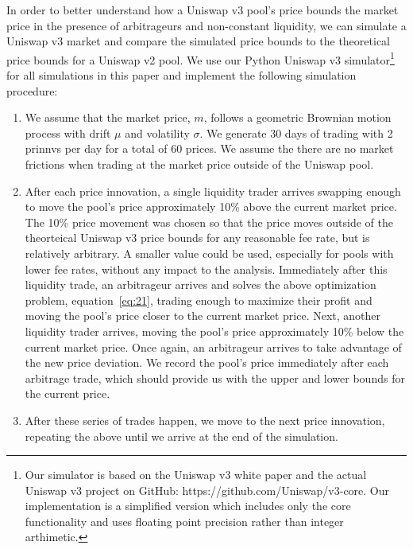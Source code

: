 \documentclass[11pt]{article}
\begin{document}
In order to better understand how a Uniswap v3 pool's price bounds the market price in the presence of arbitrageurs and non-constant liquidity, we can simulate a Uniswap v3 market and compare the simulated price bounds to the theoretical price bounds for a Uniswap v2 pool. We use our Python Uniswap v3 simulator\footnote{Our simulator is based on the Uniswap v3 white paper and the actual Uniswap v3 project on GitHub: https://github.com/Uniswap/v3-core. Our implementation is a simplified version which includes only the core functionality and uses floating point precision rather than integer arthimetic.} for all simulations in this paper and implement the following simulation procedure:
\begin{enumerate}
    \item We assume that the market price, $m$, follows a geometric Brownian motion process with drift $\mu$ and volatility $\sigma$. We generate 30 days of trading with 2 \glspl{prinnv} per day for a total of 60 prices. We assume the there are no market frictions when trading at the market price outside of the Uniswap pool.

    \item After each price innovation, a single liquidity trader arrives swapping enough to move the pool's price approximately 10\% above the current market price. The 10\% price movement was chosen so that the price moves outside of the theorteical Uniswap v3 price bounds for any reasonable fee rate, but is relatively arbitrary. A smaller value could be used, especially for pools with lower fee rates, without any impact to the analysis. Immediately after this liquidity trade, an arbitrageur arrives and solves the above optimization problem, equation~\eqref{eq:21}, trading enough to maximize their profit and moving the pool's price closer to the current market price. Next, another liquidity trader arrives, moving the pool's price approximately 10\% below the current market price. Once again, an arbitrageur arrives to take advantage of the new price deviation. We record the pool's price immediately after each arbitrage trade, which should provide us with the upper and lower bounds for the current price.

    \item After these series of trades happen, we move to the next price innovation, repeating the above until we arrive at the end of the simulation.
\end{enumerate}
\end{document}
